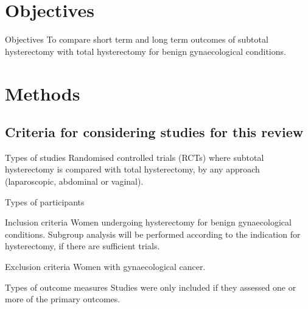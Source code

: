 \documentclass{beamer}
\begin{document}
\section{Objectives}
\begin{frame}{Objectives}
    To compare short term and long term outcomes of subtotal hysterectomy with
    total hysterectomy for benign gynaecological conditions.
\end{frame}

\section{Methods}
\subsection{Criteria for considering studies for this review}
\begin{frame}{Types of studies}
    Randomised controlled trials (RCTs) where subtotal hysterectomy is compared
    with total hysterectomy, by any approach (laparoscopic, abdominal or
    vaginal).
\end{frame}

\begin{frame}{Types of participants}
    \begin{block}{Inclusion criteria}
        Women undergoing hysterectomy for benign gynaecological conditions.
        Subgroup analysis will be performed according to the indication for
        hysterectomy, if there are sufficient trials.
    \end{block}

    \begin{block}{Exclusion criteria}
        Women with gynaecological cancer.
    \end{block}
\end{frame}

\begin{frame}{Types of outcome measures}
    Studies were only included if they assessed one or more of the primary
    outcomes.
\end{frame}
\end{document}

